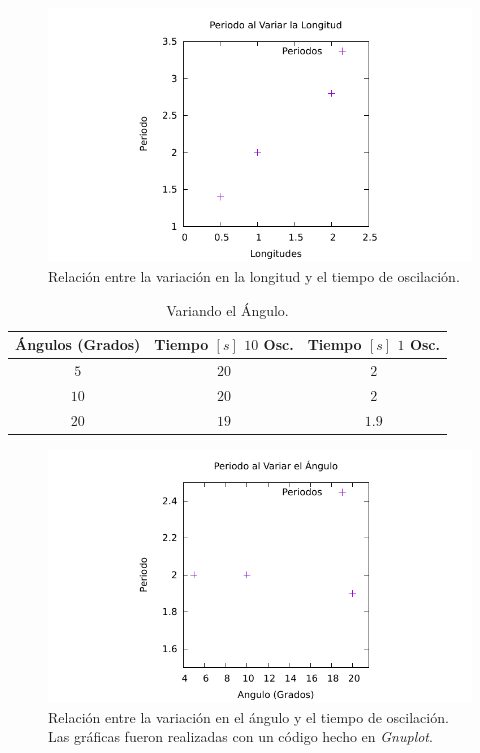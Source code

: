 \documentclass[conference]{IEEEtran}
\begin{document}
    \begin{figure}[H]
    	\centering
    	\includegraphics[scale=0.6]{graficas/longitudes.pdf}
    	\caption{Relación entre la variación en la longitud y el tiempo de oscilación.}
    \end{figure}
    
    
    
    \begin{table}[H]
    	\centering
    	\caption{Variando el Ángulo.}
    	\begin{tabular}{||c|c|c||}
    		\hline
    		\hline
				Ángulos (Grados) & Tiempo $[s]$ $10$ Osc. & Tiempo $[s]$ $1$ Osc. \\
    		\hline
    		\hline
    			$5$ & $20$ & $2$ \\
    			$10$ & $20$ & $2$ \\
    			$20$ & $19$ & $1.9$ \\
    		\hline
    		\hline
    	\end{tabular}
    \end{table}
    
    \begin{figure}[H]
    	\centering
    	\includegraphics[scale=0.6]{graficas/angulos.pdf}
    	\caption{Relación entre la variación en el ángulo y el tiempo de oscilación. Las gráficas fueron realizadas con un código hecho en \textit{Gnuplot}.}
    \end{figure}
    
\end{document}
